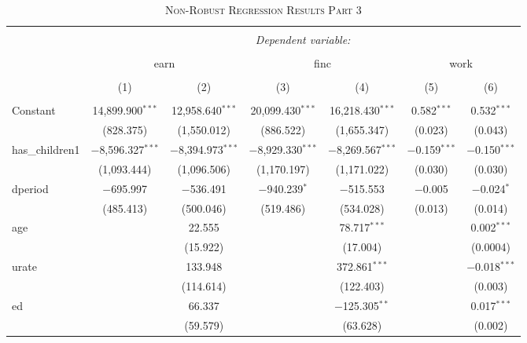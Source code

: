 \documentclass[a4paper]{article}
\begin{document}
\begin{table}[!htbp] \centering 
\begin{adjustwidth}{0.cm}{-0cm}
\begin{threeparttable}
\small
\captionsetup{font=small, justification=raggedright,singlelinecheck=false}
\caption{\textsc{Non-Robust Regression Results Part 3}}
\centering 
  \label{}
\small 
\begin{tabular}{@{\extracolsep{-2pt}}lcccccc} 
\\[-5.8ex]\hline 
\hline \\[-1.8ex] 
 & \multicolumn{6}{c}{\textit{Dependent variable:}} \\ 
\cline{2-7} 
\\[-1.8ex] & \multicolumn{2}{c}{earn} & \multicolumn{2}{c}{finc} & \multicolumn{2}{c}{work} \\ 
\\[-1.8ex] & (1) & (2) & (3) & (4) & (5) & (6)\\ 
\hline \\[-1.8ex] 
 Constant & 14,899.900$^{***}$ & 12,958.640$^{***}$ & 20,099.430$^{***}$ & 16,218.430$^{***}$ & 0.582$^{***}$ & 0.532$^{***}$ \\ 
  & (828.375) & (1,550.012) & (886.522) & (1,655.347) & (0.023) & (0.043) \\ 
  has\_children1 & $-$8,596.327$^{***}$ & $-$8,394.973$^{***}$ & $-$8,929.330$^{***}$ & $-$8,269.567$^{***}$ & $-$0.159$^{***}$ & $-$0.150$^{***}$ \\ 
  & (1,093.444) & (1,096.506) & (1,170.197) & (1,171.022) & (0.030) & (0.030) \\ 
  dperiod & $-$695.997 & $-$536.491 & $-$940.239$^{*}$ & $-$515.553 & $-$0.005 & $-$0.024$^{*}$ \\ 
  & (485.413) & (500.046) & (519.486) & (534.028) & (0.013) & (0.014) \\ 
  age &  & 22.555 &  & 78.717$^{***}$ &  & 0.002$^{***}$ \\ 
  &  & (15.922) &  & (17.004) &  & (0.0004) \\ 
  urate &  & 133.948 &  & 372.861$^{***}$ &  & $-$0.018$^{***}$ \\ 
  &  & (114.614) &  & (122.403) &  & (0.003) \\ 
  ed &  & 66.337 &  & $-$125.305$^{**}$ &  & 0.017$^{***}$ \\ 
  &  & (59.579) &  & (63.628) &  & (0.002) \\ 

\end{tabular}
\end{threeparttable}
\end{adjustwidth}
\end{table}
\end{document}

